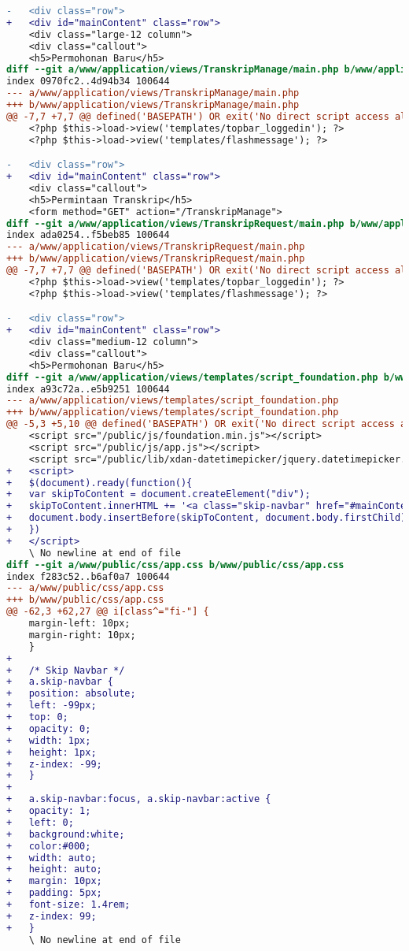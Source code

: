\begin{lstlisting}[frame=single, label={lst:perbaikan_2.4.1_bypass_blocks}, language=diff, caption=Perbaikan Kriteria Sukses 2.4.1 - Mekanisme untuk Melompati Area Konten yang Berulang]
-   <div class="row">
+   <div id="mainContent" class="row">
    <div class="large-12 column">
    <div class="callout">
    <h5>Permohonan Baru</h5>
diff --git a/www/application/views/TranskripManage/main.php b/www/application/views/TranskripManage/main.php
index 0970fc2..4d94b34 100644
--- a/www/application/views/TranskripManage/main.php
+++ b/www/application/views/TranskripManage/main.php
@@ -7,7 +7,7 @@ defined('BASEPATH') OR exit('No direct script access allowed');
    <?php $this->load->view('templates/topbar_loggedin'); ?>
    <?php $this->load->view('templates/flashmessage'); ?>

-   <div class="row">
+   <div id="mainContent" class="row">
    <div class="callout">
    <h5>Permintaan Transkrip</h5>
    <form method="GET" action="/TranskripManage">
diff --git a/www/application/views/TranskripRequest/main.php b/www/application/views/TranskripRequest/main.php
index ada0254..f5beb85 100644
--- a/www/application/views/TranskripRequest/main.php
+++ b/www/application/views/TranskripRequest/main.php
@@ -7,7 +7,7 @@ defined('BASEPATH') OR exit('No direct script access allowed');
    <?php $this->load->view('templates/topbar_loggedin'); ?>
    <?php $this->load->view('templates/flashmessage'); ?>

-   <div class="row">
+   <div id="mainContent" class="row">
    <div class="medium-12 column">
    <div class="callout">
    <h5>Permohonan Baru</h5>
diff --git a/www/application/views/templates/script_foundation.php b/www/application/views/templates/script_foundation.php
index a93c72a..e5b9251 100644
--- a/www/application/views/templates/script_foundation.php
+++ b/www/application/views/templates/script_foundation.php
@@ -5,3 +5,10 @@ defined('BASEPATH') OR exit('No direct script access allowed');
    <script src="/public/js/foundation.min.js"></script>
    <script src="/public/js/app.js"></script>
    <script src="/public/lib/xdan-datetimepicker/jquery.datetimepicker.full.min.js"></script>
+   <script>
+   $(document).ready(function(){
+   var skipToContent = document.createElement("div");
+   skipToContent.innerHTML += '<a class="skip-navbar" href="#mainContent">Lompat ke menu utama</a>';
+   document.body.insertBefore(skipToContent, document.body.firstChild);
+   })
+   </script>
    \ No newline at end of file
diff --git a/www/public/css/app.css b/www/public/css/app.css
index f283c52..b6af0a7 100644
--- a/www/public/css/app.css
+++ b/www/public/css/app.css
@@ -62,3 +62,27 @@ i[class^="fi-"] {
    margin-left: 10px;
    margin-right: 10px;    
    }
+
+   /* Skip Navbar */
+   a.skip-navbar {
+   position: absolute;
+   left: -99px;
+   top: 0;
+   opacity: 0;
+   width: 1px;
+   height: 1px;
+   z-index: -99;
+   }
+
+   a.skip-navbar:focus, a.skip-navbar:active {
+   opacity: 1;
+   left: 0;
+   background:white;
+   color:#000;
+   width: auto;
+   height: auto;
+   margin: 10px;
+   padding: 5px;
+   font-size: 1.4rem;
+   z-index: 99;
+   }
    \ No newline at end of file
\end{lstlisting}

